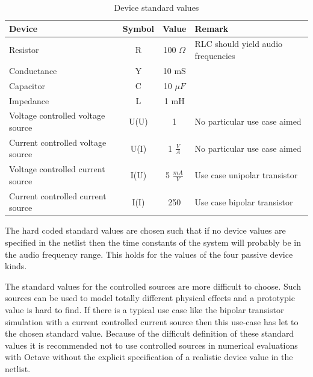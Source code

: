 \begin{table}[bt]
\begin{center}
{
\setlength{\extrarowheight}{1pt} %
\begin{tabular}{|l|c|c|l|}

\hline

Device & Symbol & Value & Remark \\
\hline

Resistor                          & R    & 100 $\Omega$     & RLC should yield audio frequencies \\
Conductance                       & Y    & 10 mS            &                                    \\
Capacitor                         & C    & 10 $\mu F$       &                                    \\
Impedance                         & L    & 1 mH             &                                    \\
Voltage controlled voltage source & U(U) & 1                & No particular use case aimed       \\
Current controlled voltage source & U(I) & 1 $\frac{V}{A}$  & No particular use case aimed       \\
Voltage controlled current source & I(U) & 5 $\frac{mA}{V}$ & Use case unipolar transistor       \\
Current controlled current source & I(I) & 250              & Use case bipolar transistor        \\

\hline

\end{tabular}
\caption{Device standard values}
\label{tabDeviceStdValues}
} %
\end{center}
\end{table}

The hard coded standard values are chosen such that if no device values are
specified in the netlist then the time constants of the system will
probably be in the audio frequency range. This holds for the values of
the four passive device kinds.

The standard values for the controlled sources are more difficult to
choose. Such sources can be used to model totally different physical
effects and a prototypic value is hard to find. If there is a typical use
case like the bipolar transistor simulation with a current controlled
current source then this use-case has let to the chosen standard value.
Because of the difficult definition of these standard values it is
recommended not to use controlled sources in numerical evaluations with
Octave without the explicit specification of a realistic device value in
the netlist.

